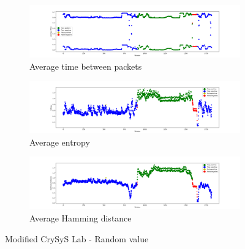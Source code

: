 \begin{figure}
    \centering
    \begin{subfigure}[b]{\linewidth}
        \includegraphics[width = \linewidth]{img/parts/app/tests/crysys/rand/AvgTime.png}
        \caption{Average time between packets}
        \label{subfig:extract_crysys_rand_avgtime}
    \end{subfigure}
    \begin{subfigure}[b]{\linewidth}
        \includegraphics[width = \linewidth]{img/parts/app/tests/crysys/rand/Entropy.png}
        \caption{Average entropy}
        \label{subfig:extract_crysys_rand_entropy}
    \end{subfigure}
    \begin{subfigure}[b]{\linewidth}
        \includegraphics[width = \linewidth]{img/parts/app/tests/crysys/rand/HammingDist.png}
        \caption{Average Hamming distance}
        \label{subfig:extract_crysys_rand_hammingdist}
    \end{subfigure}
    \caption{Modified CrySyS Lab - Random value}
    \label{fig:extract_crysys_rand}
\end{figure}